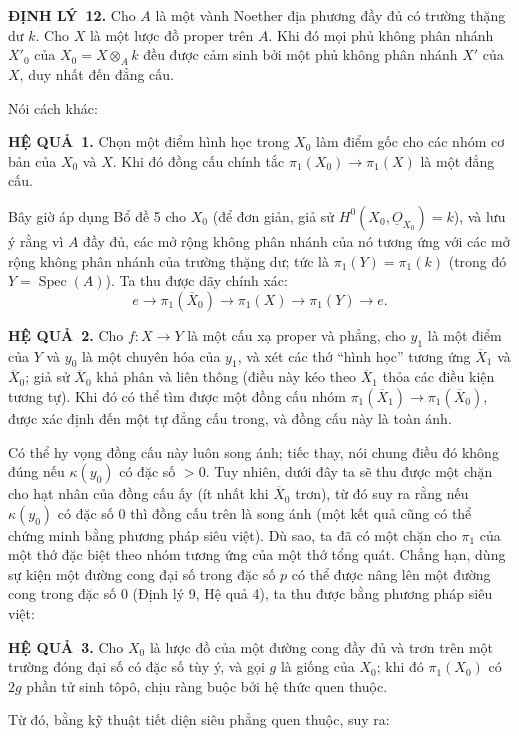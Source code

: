 \documentclass[11pt,twoside,openany]{book}
\numberwithin{equation}{section}
\newcommand{\src}[1]{%
  \phantomsection\hypertarget{src:\fgasourceid:#1}{}%
  \marginpar{\raggedleft\footnotesize\sffamily #1}%
}
\newcommand{\fgasourceid}{unset}
\newcommand{\Osh}{\underline{O}}
\newcommand{\result}[2]{\par\medskip\noindent\textbf{#1\if\relax\detokenize{#2}\relax\else\ #2\fi.}\quad}
\begin{document}
\result{ĐỊNH LÝ}{12} Cho $A$ là một vành Noether địa phương đầy đủ có trường
thặng dư $k$. Cho $X$ là một lược đồ proper trên $A$. Khi đó mọi phủ không
phân nhánh $X'_0$ của $X_0=X\otimes_A k$ đều được cảm sinh bởi một phủ không
phân nhánh $X'$ của $X$, duy nhất đến đẳng cấu.

Nói cách khác:

\result{HỆ QUẢ}{1} Chọn một điểm hình học trong $X_0$ làm điểm gốc cho các
nhóm cơ bản của $X_0$ và $X$. Khi đó đồng cấu chính tắc
$\pi_1(X_0)\longrightarrow\pi_1(X)$ là một đẳng cấu.

Bây giờ áp dụng Bổ đề 5 cho $X_0$ (để đơn giản, giả sử
$H^0(X_0,\Osh_{X_0})=k$), và lưu ý rằng vì $A$ đầy đủ, các mở rộng không phân
nhánh của nó tương ứng với các mở rộng không phân nhánh của trường thặng dư;
tức là $\pi_1(Y)=\pi_1(k)$ (trong đó $Y=\operatorname{Spec}(A)$). Ta thu được
dãy chính xác:
\[
  e\longrightarrow\pi_1(\overline X_0)
  \longrightarrow\pi_1(X)\longrightarrow\pi_1(Y)\longrightarrow e.
\]

\result{HỆ QUẢ}{2} Cho $f:X\longrightarrow Y$ là một cấu xạ proper và phẳng,
cho $y_1$ là một điểm của $Y$ và $y_0$ là một chuyên hóa của $y_1$, và xét các
thớ “hình học” tương ứng $\overline X_1$ và $\overline X_0$; giả sử
$\overline X_0$ khả phân và liên thông (điều này kéo theo
$\overline X_1$ thỏa các điều kiện tương tự). Khi đó có thể tìm được một đồng
cấu nhóm
$\pi_1(\overline X_1)\longrightarrow\pi_1(\overline X_0)$, được xác định đến
một tự đẳng cấu trong, và đồng cấu này là toàn ánh.


\src{217}
Có thể hy vọng đồng cấu này luôn song ánh; tiếc thay, nói chung điều đó không
đúng nếu $\kappa(y_0)$ có đặc số $>0$. Tuy nhiên, dưới đây ta sẽ thu được một
chặn cho hạt nhân của đồng cấu ấy (ít nhất khi $\overline X_0$ trơn), từ đó suy
ra rằng nếu $\kappa(y_0)$ có đặc số $0$ thì đồng cấu trên là song ánh (một kết
quả cũng có thể chứng minh bằng phương pháp siêu việt). Dù sao, ta đã có một
chặn cho $\pi_1$ của một thớ đặc biệt theo nhóm tương ứng của một thớ tổng quát.
Chẳng hạn, dùng sự kiện một đường cong đại số trong đặc số $p$ có thể được nâng
lên một đường cong trong đặc số $0$ (Định lý 9, Hệ quả 4), ta thu được bằng
phương pháp siêu việt:

\result{HỆ QUẢ}{3} Cho $X_0$ là lược đồ của một đường cong đầy đủ và trơn trên
một trường đóng đại số có đặc số tùy ý, và gọi $g$ là giống của $X_0$; khi đó
$\pi_1(X_0)$ có $2g$ phần tử sinh tôpô, chịu ràng buộc bởi hệ thức quen thuộc.

Từ đó, bằng kỹ thuật tiết diện siêu phẳng quen thuộc, suy ra:
\end{document}
